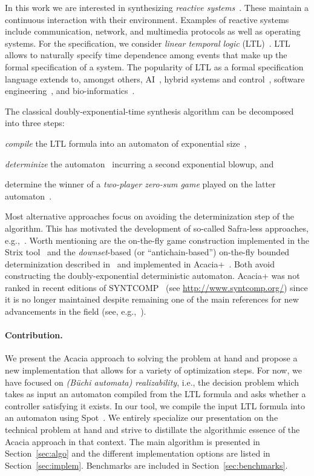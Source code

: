 \documentclass[runningheads,a4paper]{llncs}
\begin{document}
In this work we are interested in synthesizing \emph{reactive
systems}~\cite{hp84}. These maintain a continuous interaction with their
environment.  Examples of reactive systems include communication, network, and
multimedia protocols as well as operating systems.  For the specification, we
consider \emph{linear temporal logic} (LTL)~\cite{pnueli77}. LTL allows to
naturally specify time dependence among events that make up the formal
specification of a system. The popularity of LTL as a formal specification
language extends to, amongst others, AI~\cite{gv16,cm19,gnpw20}, hybrid
systems and control~\cite{bvpyb16}, software engineering~\cite{lpb15}, and
bio-informatics~\cite{abbdfhinprs17}.

The classical doubly-exponential-time synthesis algorithm can be decomposed
into three steps:
\begin{enumerate*}
  \item \emph{compile} the LTL formula into an automaton of exponential
    size~\cite{vw84},
  \item \emph{determinize} the automaton~\cite{safra88,piterman07} incurring a
    second exponential blowup, and
  \item determine the winner of a \emph{two-player zero-sum game} played
    on the latter automaton~\cite{pr89}.
\end{enumerate*}
Most alternative approaches focus on avoiding the determinization step of the
algorithm. This has motivated the development of so-called Safra-less
approaches, e.g.,~\cite{kpv06,eks16,ekrs17,tushy17}. Worth mentioning are the
on-the-fly game construction implemented in the Strix tool~\cite{msl18} and
the \emph{downset}-based (or ``antichain-based'') on-the-fly bounded
determinization described in~\cite{fjr09} and implemented in
Acacia+~\cite{bbfjr12}. Both avoid constructing the doubly-exponential
deterministic automaton.  Acacia+ was not ranked in recent editions of
SYNTCOMP~\cite{syntcomp17} (see \url{http://www.syntcomp.org/}) since it is no longer
maintained despite remaining one of the main references for new advancements
in the field (see, e.g.,~\cite{ffrt17,ztlpv17,apsec20,lms20,bltv20}).

\paragraph*{Contribution.}
We present the Acacia approach to solving the problem at hand and propose a
new implementation that allows for a variety of optimization steps.  For now,
we have focused on \emph{(B\"uchi automata) realizability}, i.e., the decision
problem which takes as input an automaton compiled from the LTL formula and
asks whether a controller satisfying it exists. In our tool, we compile the
input LTL formula into an automaton using Spot~\cite{duret.16.atva2}.  We
entirely specialize our presentation on the technical problem at hand and
strive to distillate the algorithmic essence of the Acacia approach in that
context. The main algorithm is presented in Section~\ref{sec:algo} and the
different implementation options are listed in Section~\ref{sec:implem}.
Benchmarks are included in Section~\ref{sec:benchmarks}.
\end{document}
